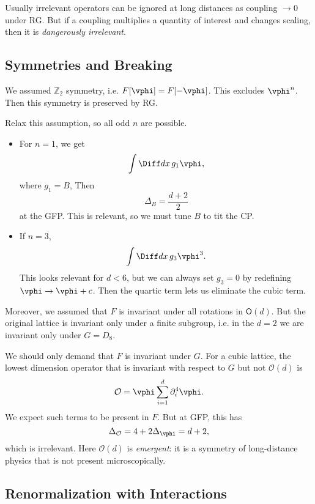 \documentclass[12pt]{article}
\begin{document}
Usually irrelevant operators can be ignored at long distances as coupling $\to 0$ under RG. But if a coupling multiplies a quantity of interest and changes scaling, then it is \emph{dangerously irrelevant}.

\subsection{Symmetries and Breaking}%
\label{sub:sab}

We assumed $\mathbb{Z}_2$ symmetry, i.e. $F[\vphi] = F[-\vphi]$. This excludes $\vphi^{n}$. Then this symmetry is preserved by RG.

Relax this assumption, so all odd $n$ are possible.
\begin{itemize}
	\item For $n = 1$, we get
		\[
		\int \Diff d x \, g_1 \vphi,
		\]
		where $g_1 = B$, Then
		\[
		\Delta_B = \frac{d+2}{2}
		\]
		at the GFP. This is relevant, so we must tune $B$ to tit the CP.
	\item If $n = 3$,
		\[
		\int \Diff d x \, g_3 \vphi^3.
		\]
		This looks relevant for $d < 6$, but we can always set $g_3 = 0$ by redefining $\vphi \to \vphi + c$. Then the quartic term lets us eliminate the cubic term.
\end{itemize}

Moreover, we assumed that $F$ is invariant under all rotations in $\mathsf{O}(d)$. But the original lattice is invariant only under a finite subgroup, i.e. in the $d = 2$ we are invariant only under $G = D_8$.

We should only demand that $F$ is invariant under $G$. For a cubic lattice, the lowest dimension operator that is invariant with respect to $G$ but not $\mathcal{O}(d)$ is
\[
\mathcal{O} = \vphi \sum_{i = 1}^d \partial_i^4 \vphi.
\]
We expect such terms to be present in $F$. But at GFP, this has
\[
\Delta_{\mathcal{O}} = 4 + 2 \Delta_{\vphi} = d + 2,
\]
which is irrelevant. Here $\mathcal{O}(d)$ is \emph{emergent}: it is a symmetry of long-distance physics that is not present microscopically.

\subsection{Renormalization with Interactions}%
\label{sub:ri}
\end{document}
